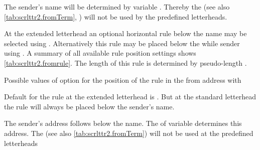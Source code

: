 %
\EndIndexGroup


\begin{Declaration}
\end{Declaration}
%
%
The sender's name will be determined by
variable . Thereby the  (see also
\autoref{tab:scrlttr2.fromTerm}, ) will not
be used by the predefined letterheads.

At the extended letterhead an
optional horizontal rule below the name may be selected using
.
Alternatively this rule may
be placed below the while sender using . A
summary of all available rule position settings shows
\autoref{tab:scrlttr2.fromrule}. The length of this rule is determined by
pseudo-length .

\begin{table}
  \caption[{Possible values of option  with
    }]{Possible values of option  for the
    position of the rule in the from address with
    }
  \label{tab:scrlttr2.fromrule}
  \begin{desctabular}
  \end{desctabular}
\end{table}

Default for the rule at the extended letterhead is . But at the
standard letterhead the rule will always be placed below the sender's name.

The sender's address follows below the
name. The  of variable  determines this
address. The  (see also \autoref{tab:scrlttr2.fromTerm})
will not be used at the predefined letterheads

